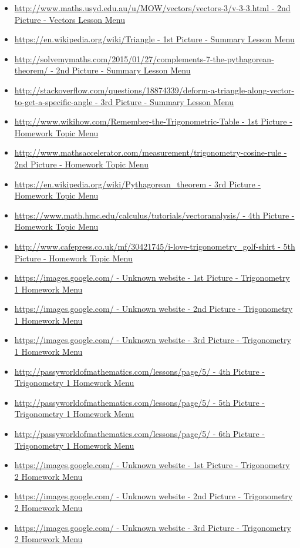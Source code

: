\begin{itemize}
	\item \url{http://www.maths.usyd.edu.au/u/MOW/vectors/vectors-3/v-3-3.html - 2nd Picture - Vectors Lesson Menu}
	\item \url{https://en.wikipedia.org/wiki/Triangle - 1st Picture - Summary Lesson Menu}
	\item \url{http://solvemymaths.com/2015/01/27/complements-7-the-pythagorean-theorem/ - 2nd Picture - Summary Lesson Menu}
	\item \url{http://stackoverflow.com/questions/18874339/deform-a-triangle-along-vector-to-get-a-specific-angle - 3rd Picture - Summary Lesson Menu}
	\item \url{http://www.wikihow.com/Remember-the-Trigonometric-Table - 1st Picture - Homework Topic Menu}
	\item \url{http://www.mathsaccelerator.com/measurement/trigonometry-cosine-rule - 2nd Picture - Homework Topic Menu}
	\item \url{https://en.wikipedia.org/wiki/Pythagorean_theorem - 3rd Picture - Homework Topic Menu}
	\item \url{https://www.math.hmc.edu/calculus/tutorials/vectoranalysis/ - 4th Picture - Homework Topic Menu}
	\item \url{http://www.cafepress.co.uk/mf/30421745/i-love-trigonometry_golf-shirt - 5th Picture - Homework Topic Menu}
	\item \url{https://images.google.com/ - Unknown website - 1st Picture - Trigonometry 1 Homework Menu}
	\item \url{https://images.google.com/ - Unknown website - 2nd Picture - Trigonometry 1 Homework Menu}
	\item \url{https://images.google.com/ - Unknown website - 3rd Picture - Trigonometry 1 Homework Menu}
	\item \url{http://passyworldofmathematics.com/lessons/page/5/ - 4th Picture - Trigonometry 1 Homework Menu}
	\item \url{http://passyworldofmathematics.com/lessons/page/5/ - 5th Picture - Trigonometry 1 Homework Menu}
	\item \url{http://passyworldofmathematics.com/lessons/page/5/ - 6th Picture - Trigonometry 1 Homework Menu}
	\item \url{https://images.google.com/ - Unknown website - 1st Picture - Trigonometry 2 Homework Menu}
	\item \url{https://images.google.com/ - Unknown website - 2nd Picture - Trigonometry 2 Homework Menu}
	\item \url{https://images.google.com/ - Unknown website - 3rd Picture - Trigonometry 2 Homework Menu}

\end{itemize}
